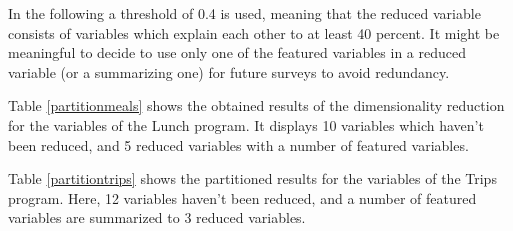 \documentclass[12pt, a4paper, titlepage]{article}\usepackage[]{graphicx}\usepackage[]{color}
\begin{document}
In the following a threshold of 0.4 is used, meaning that the reduced variable consists of variables which explain each other to at least 40 percent. It might be meaningful to decide to use only one of the featured variables in a reduced variable (or a summarizing one) for future surveys to avoid redundancy.

Table \ref{partitionmeals} shows the obtained results of the dimensionality reduction for the variables of the Lunch program. It displays 10 variables which haven't been reduced, and 5 reduced variables with a number of featured variables.

Table \ref{partitiontrips} shows the partitioned results for the variables of the Trips program. Here, 12 variables haven't been reduced, and a number of featured variables are summarized to 3 reduced variables. 
\end{document}
